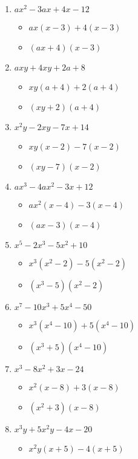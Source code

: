 \documentclass{article}
\begin{document}
\begin{enumerate}
\begin{itemize}
  \end{itemize}
\item $ax^{2} - 3ax + 4x - 12$
  \begin{itemize}
  \item $ax(x-3)+4(x-3)$
  \item $(ax+4)(x-3)$
  \end{itemize}
\item $axy + 4xy + 2a + 8$
  \begin{itemize}
  \item $xy(a+4)+2(a+4)$
  \item $(xy+2)(a+4)$
  \end{itemize}
\item $x^{2}y - 2xy - 7x + 14$
  \begin{itemize}
  \item $xy(x-2)-7(x-2)$
  \item $(xy-7)(x-2)$
  \end{itemize}
\item $ax^{3} - 4ax^{2} - 3x + 12$
  \begin{itemize}
  \item $ax^{2}(x-4)-3(x-4)$
  \item $(ax-3)(x-4)$
  \end{itemize}
\item $x^{5} - 2x^{3} - 5x^{2} + 10$
  \begin{itemize}
  \item $x^{3}(x^{2}-2)-5(x^{2}-2)$
  \item $(x^{3}-5)(x^{2}-2)$
  \end{itemize}
\item $x^{7} - 10x^{3} + 5x^{4} - 50$
  \begin{itemize}
  \item $x^{3}(x^{4}-10)+5(x^{4}-10)$
  \item $(x^{3}+5)(x^{4}-10)$
  \end{itemize}
\item $x^{3} - 8x^{2} + 3x - 24$
  \begin{itemize}
  \item $x^{2}(x-8)+3(x-8)$
  \item $(x^{2}+3)(x-8)$
  \end{itemize}
\item $x^{3}y + 5x^{2}y - 4x - 20$
  \begin{itemize}
  \item $x^{2}y(x+5)-4(x+5)$

\end{itemize}
\end{enumerate}
\end{document}
